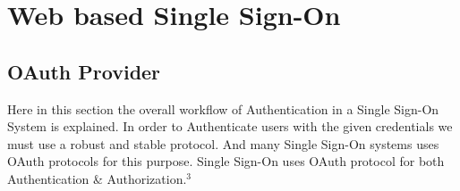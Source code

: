 \documentclass[12pt]{report}
\begin{document}
\chapter{Web based Single Sign-On}

\section{OAuth Provider}
\hspace{6mm} \linebreak Here in this section the overall workflow of Authentication in a Single Sign-On System is explained. In order to Authenticate users with the given credentials we must use a robust and stable protocol. And many Single Sign-On systems uses OAuth protocols for this purpose. Single Sign-On uses OAuth protocol for both Authentication \& Authorization.$ ^{3}$
\end{document}
